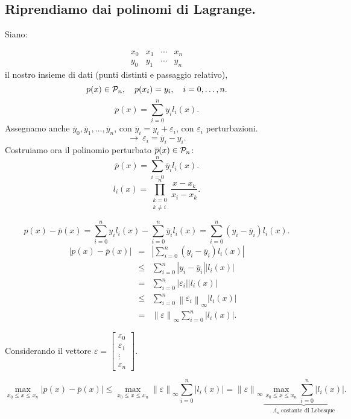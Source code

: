 \subsection*{Riprendiamo dai polinomi di Lagrange.}
Siano:

\[\begin{array}{ccccc}
x_0 & x_1 & \cdots & x_n   \\
y_0 & y_1 & \cdots & y_n
\end{array}\]
il nostro insieme di dati (punti distinti e passaggio relativo),
\[p(x) \in \mathcal{P}_n, \quad p(x_i) = y_i, \quad i = 0,\ldots, n.\]
\[p(x) = \sum_{i = 0}^{n}y_il_i(x).\]
Assegnamo anche $\overline{y}_0, \overline{y}_1, \ldots, \overline{y}_n$, con
$\overline{y}_i = y_i + \varepsilon_i$, con $\varepsilon_i$ perturbazioni.
\[\longrightarrow\ \varepsilon_i = \overline{y}_i -y_i.\]
Costruiamo ora il polinomio perturbato $\overline{p}(x) \in \mathcal{P}_n$:
\[\overline{p}(x) = \sum_{i = 0}^n\overline{y}_il_i(x).\]
\[l_i(x) = \prod_{\substack{k=0\\ k \neq i }}^n\frac{x-x_k}{x_i-x_k}.\]

\[p(x) - \overline{p}(x) = \sum_{i = 0}^{n}y_il_i(x) -
\sum_{i = 0}^{n}\overline{y}_il_i(x) = \sum_{i=0}^n(y_i - \overline{y}_i)l_i(x).\]
\[
\begin{array}{lcl}
\left| p(x) - \overline{p}(x)\right| & = & \displaystyle
\left| \sum_{i=0}^n(y_i -
\overline{y}_i)l_i(x)\right| \\
& \leq &\displaystyle  \sum_{i=0}^n\left|y_i - \overline{y}_i\right|
\left|l_i(x)
\right| \\
& = &\displaystyle  \sum_{i=0}^n\left|\varepsilon_i\right|\left|l_i(x)\right|
\\
& \leq &\displaystyle  \sum_{i=0}^n\left\|\varepsilon_i\right\|_{\infty}
\left|l_i(x)\right| \\
& = &\displaystyle  \left\|\varepsilon\right\|_{\infty}\sum_{i=0}^n\left|l_i(x)
\right|.
\end{array}
\]

\begin{center}
Considerando il vettore
$\varepsilon = \left[
\begin{array}{c}
\varepsilon_0 \\
\varepsilon_1 \\
\vdots \\
\varepsilon_n
\end{array}
\right].
$
\end{center}

\[\max_{x_0 \leq x \leq x_n}|p(x) - \overline{p}(x)| \leq \max_{x_0 \leq x \leq x_n}
\left\|\varepsilon\right\|_{\infty}\sum_{i=0}^n\left|l_i(x)\right|
= \left\|\varepsilon\right\|_{\infty}
\underbrace{\max_{x_0 \leq x \leq x_n}\sum_{i=0}^n\left|l_i(x)\right|}_{\Lambda_n \
\textrm{costante di Lebesque}}.
\]

